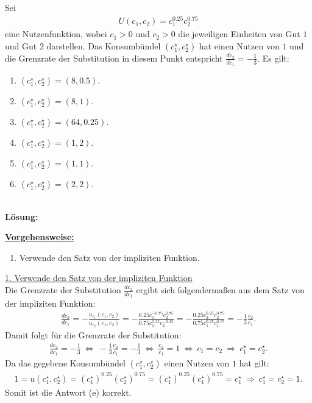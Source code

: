 \newpage

\subsection*{}
Sei 
\begin{align*}
	U(c_1,c_2) = c_1^{0.25} c_2^{0.75}
\end{align*}
eine Nutzenfunktion, wobei $c_1 > 0$ und $c_2 > 0$ die jeweiligen Einheiten von Gut $1$ und Gut $2$ darstellen.
Das Konsumbündel $(c_1^\star, c_2^\star)$ hat einen Nutzen von $1$ und die Grenzrate der Substitution in diesem Punkt entspricht
$\frac{d c_2}{d c_1} = - \frac{1}{3}$.
Es gilt:
\renewcommand{\labelenumi}{(\alph{enumi})}
\begin{enumerate}
	\item 
	$ (c_1^\star,c_2^\star) = (8,0.5) $.
	\item
	$ (c_1^\star,c_2^\star) = (8,1) $.
	\item
	$ (c_1^\star,c_2^\star) = (64,0.25) $.
	\item
	$ (c_1^\star,c_2^\star) = (1,2) $.
	\item
	$ (c_1^\star,c_2^\star) = (1,1) $.
	\item
	$ (c_1^\star,c_2^\star) = (2,2) $.
\end{enumerate}
\ \\
\textbf{Lösung:}
\begin{mdframed}
\underline{\textbf{Vorgehensweise:}}
\renewcommand{\labelenumi}{\theenumi.}
\begin{enumerate}
\item Verwende den Satz von der impliziten Funktion.
\end{enumerate}
\end{mdframed}

\underline{1. Verwende den Satz von der impliziten Funktion}\\
Die Grenzrate der Substitution $\frac{d c_2}{d c_1 }$ ergibt sich folgendermaßen aus dem Satz von der impliziten Funktion:
\begin{align*}
	\frac{d c_2}{d c_1}
	=
	-\frac{u_{c_1}(c_1,c_2)}{u_{c_2}(c_1,c_2) }
	=
	-
	\frac{0.25 c_1^{-0.75} c_2^{0.75}}{0.75 c_1^{0.25} c_2^{-0.25}}
	=
	-
	\frac{0.25 c_2^{0.25} c_2^{0.75}}{0.75 c_1^{0.25} c_1^{0.75}}
	=
	- \frac{1}{3} \frac{c_2}{c_1}.
\end{align*}
Damit folgt für die Grenzrate der Substitution:
\begin{align*}
	\frac{d c_2}{d c_1}
	= - \frac{1}{3}
	\ \Leftrightarrow \
	- \frac{1}{3} \frac{c_2}{c_1} = - \frac{1}{3}
	\ \Leftrightarrow \
	\frac{c_2}{c_1} = 1 
	\ \Leftrightarrow \
	c_1 = c_2
	\ \Rightarrow \
	c_1^\star = c_2^\star.
\end{align*}
Da das gegebene Konsumbündel $( c_1^\star , c_2^\star ) $ einen Nutzen von $1$ hat gilt:
\begin{align*}
	1
	= 
	u(c_1^\star, c_2^\star )
	=
	(c_1^\star)^{0.25}  (c_2^\star)^{0.75} 
	=
	(c_1^\star)^{0.25}  (c_1^\star)^{0.75}
	=
	c_1^\star
	\ \Rightarrow \
	c_1^\star = c_2^\star = 1. 
\end{align*}
Somit ist die Antwort (e) korrekt.





